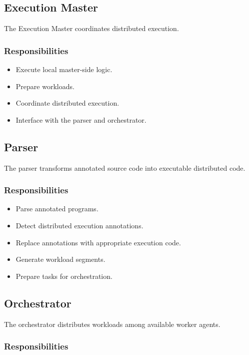 \documentclass[12pt,a4paper]{article}
\begin{document}
\subsection{Execution Master}

The Execution Master coordinates distributed execution.

\subsubsection{Responsibilities}

\begin{itemize}
    \item Execute local master-side logic.
    \item Prepare workloads.
    \item Coordinate distributed execution.
    \item Interface with the parser and orchestrator.
\end{itemize}

\subsection{Parser}

The parser transforms annotated source code into executable distributed code.

\subsubsection{Responsibilities}

\begin{itemize}
    \item Parse annotated programs.
    \item Detect distributed execution annotations.
    \item Replace annotations with appropriate execution code.
    \item Generate workload segments.
    \item Prepare tasks for orchestration.
\end{itemize}

\subsection{Orchestrator}

The orchestrator distributes workloads among available worker agents.

\subsubsection{Responsibilities}
\end{document}
